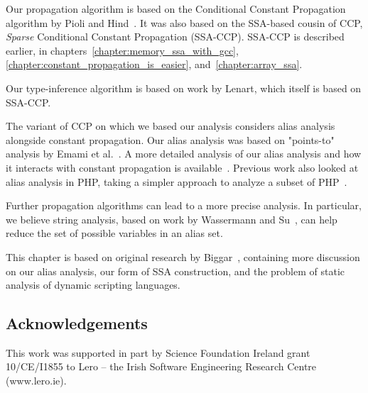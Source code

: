 Our propagation algorithm is based on the Conditional Constant
Propagation algorithm by Pioli and Hind~\cite{Pioli99}.  It was also
based on the SSA-based cousin of CCP, \textit{Sparse} Conditional
Constant Propagation (SSA-CCP). SSA-CCP is described earlier, in
chapters~\ref{chapter:memory_ssa_with_gcc},
\ref{chapter:constant_propagation_is_easier}, and~\ref{chapter:array_ssa}.

Our type-inference algorithm is based on work by
Lenart\cite{Lenart2000}, which itself is based on SSA-CCP.

The variant of CCP on which we based our analysis considers alias
analysis~\cite{EGH1994} alongside constant propagation. Our alias
analysis was based on "points-to" analysis by Emami et al.~\cite{EGH1994}.
A more detailed analysis of our alias analysis and how it interacts with
constant propagation is available~\cite{Biggar2010}. Previous work also
looked at alias analysis in PHP, taking a simpler approach to analyze a
subset of PHP~\cite{Jovanovic06pixy:a}.

Further propagation algorithms can lead to a more precise analysis. In
particular, we believe string analysis, based on work by Wassermann and
Su~\cite{Wassermann2007}, can help reduce the set of possible variables
in an alias set.

This chapter is based on original research by Biggar~\cite{Biggar2010},
containing more discussion on our alias analysis, our form of SSA
construction, and the problem of static analysis of dynamic scripting
languages.

\subsection*{Acknowledgements}
This work was supported in part by Science Foundation Ireland
grant 10/CE/I1855 to Lero -- the Irish Software Engineering
Research Centre (www.lero.ie).

